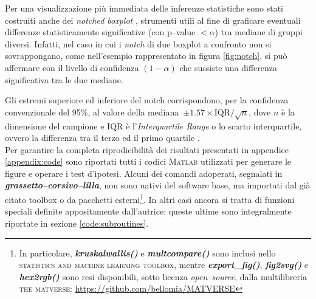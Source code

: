 Per una visualizzazione più immediata delle inferenze statistiche sono stati costruiti anche dei \emph{notched boxplot} \cite{McGill1978}, strumenti utili al fine di graficare eventuali differenze statisticamente significative (con p--value $< \alpha$) tra mediane di gruppi diversi. Infatti, nel caso in cui i \emph{notch} di due boxplot a confronto non si sovrappongano, come nell'esempio rappresentato in figura \ref{fig:notch}, si può affermare con il livello di confidenza $(1-\alpha)$ che sussiste una differenza significativa tra le due mediane. 

Gli estremi superiore ed inferiore del notch corrispondono, per la confidenza convenzionale del 95$\%$, al valore della mediana~$\pm {1.57 \times \mathrm{IQR}}/{\sqrt{n}} $, dove $n$ è la dimensione del campione e $\mathrm{IQR}$ è l'\textsl{Interquartile Range} o lo scarto interquartile, ovvero la differenza tra il terzo ed il primo quartile \cite{McGill1978}.\\

Per garantire la completa riprodicibilità dei risultati presentati in appendice \ref{appendix:code} sono riportati tutti i codici \textsc{Matlab}\textsuperscript{\tiny\sffamily\textregistered} utilizzati per generare le figure e operare i test d'ipotesi. Alcuni dei comandi adoperati, segnalati in {\mlttfamily\color{xkcdLilac}\bfseries\itshape grassetto--corsivo--lilla}, non sono nativi del software base, ma importati dal già citato toolbox o da pacchetti esterni\footnote{In particolare, {\mlttfamily\bfseries\itshape\color{xkcdLilac}kruskalwallis()} e {\mlttfamily\bfseries\itshape\color{xkcdLilac}multcompare()} sono inclusi nello \textsc{statistics and machine learning toolbox}, mentre {\mlttfamily\bfseries\itshape\color{xkcdLilac}export\_fig()}, {\mlttfamily\bfseries\itshape\color{xkcdLilac}fig2svg()} e {\mlttfamily\bfseries\itshape\color{xkcdLilac}hex2rgb()} sono resi disponibili, sotto licenza \emph{open--source}, dalla multilibreria \textsc{the matverse}: \url{https://github.com/bellomia/MATVERSE} }. In altri casi ancora si tratta di funzioni speciali definite appositamente dall'autrice: queste ultime sono integralmente riportate in sezione \ref{code:subroutines}.





